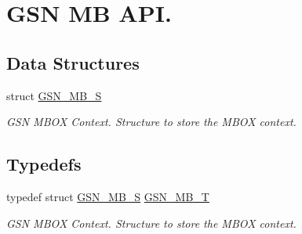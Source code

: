 \hypertarget{a00624}{
\section{GSN MB API.}
\label{a00624}
}
\subsection*{Data Structures}
\begin{DoxyCompactItemize}
\item 
struct \hyperlink{a00139}{GSN\_\-MB\_\-S}
\begin{DoxyCompactList}\small\item\em GSN MBOX Context. Structure to store the MBOX context. \end{DoxyCompactList}\end{DoxyCompactItemize}
\subsection*{Typedefs}
\begin{DoxyCompactItemize}
\item 
typedef struct \hyperlink{a00139}{GSN\_\-MB\_\-S} \hyperlink{a00624_gafb7207d32d68a7fa15928ef5fd8bf5f1}{GSN\_\-MB\_\-T}
\begin{DoxyCompactList}\small\item\em GSN MBOX Context. Structure to store the MBOX context. \end{DoxyCompactList}\end{DoxyCompactItemize}
